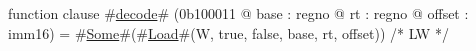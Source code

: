 function clause #\hyperref[zdecode]{decode}# (0b100011 @ base : regno @ rt : regno @ offset : imm16) =
  #\hyperref[zSome]{Some}#(#\hyperref[zLoad]{Load}#(W, true,  false, base, rt, offset)) /* LW */

